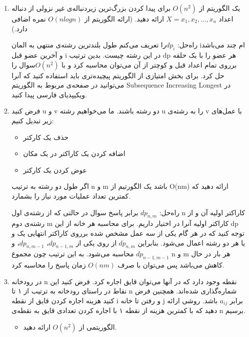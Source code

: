\documentclass{article}
\begin{document}
\begin{enumerate}
\item
یک الگوریتم از $O(n^2)$ برای پیدا کردن بزرگ‌ترین زیردنباله‌ی غیر نزولی از دنباله اعداد
$X = {x_1, x_2, ..., x_n}$
ارائه دهید.
(ارائه الگوریتم از $O(nlogn)$ نمره اضافی دارد.)

راه‌حل: $dp_i$را تعریف می‌کنم طول بلند‌ترین رشته‌ی منتهی به المان iام چند می‌باشد و آخرین عضو قبل i در این رشته چیست.
بدین ترتیب dp هر عضو را با یک حلقه برروی تمام اعداد قبل و کوچتر از آن می‌توان محاسبه کرد و با $O(n^2)$سوال را حل کرد. برای بخش امتیازی از الگوریتم پیچیده‌تری باید استفاده کنید که آنرا می‌توانید در صفحه‌ی مربوط به الگوریتم Subsequence Increasing Longest در ویکیپدیای فارسی پیدا کنید.
\item
فرض کنید u و v دو رشته باشند. ما می‌خواهیم رشته u را به رشته‌ی v با عمل‌های زیر تبدیل کنیم:
\begin{itemize}
    \item حذف یک کارکتر
    \item اضافه کردن یک کاراکتر در یک مکان
    \item
    عوض کردن یک کارکتر
\end{itemize}
اگر طول دو رشته به ترتیب n و m باشد یک الگورتیم از O(nm) ارائه دهید که کمترین تعداد عملیات مورد نیاز را بشمارد.

راه‌حل: $dp_{n,m}$ برابر پاسخ سوال در حالتی که از رشته‌ی اول n کاراکتر اولیه آن و از رشته‌ی دوم m کاراکتر اولیه آنرا در اختیار داریم. برای محاسبه هر خانه از این dp توجه کنید که در هر گام یکی از سه عمل مشخص شده برروی کاراکتر انتهایی یک و یا هر دو رشته اعمال می‌شود. بنابراین $dp_{n,m}$ از روی یکی از $dp_{n-1,m}$، $dp_{n,m-1}$، و$dp_{n-1, m-1}$ محاسبه می‌شود. به این ترتیب چون مجموع n و m هر بار در حال کاهش می‌باشد پس می‌توان با صرف $O(nm)$ زمان پاسخ را محاسبه کرد.
\item
در رودخانه n نقطه وجود دارد که در آنها می‌توان قایق اجاره کرد. فرض کنید این نقاط در راستای رود‌خانه به ترتیب از ۱ تا n شماره‌گذاری شده‌اند. همچنین فرض کنید هزینه اجاره کردن قایق از نقطه i و رفتن تا خانه j برابر $a_{ij}$
باشد. روشی ارائه دهید که با کمترین هزینه از نقطه ۱ با اجاره کردن تعدادی قایق به نقطه‌ی n برسیم.
\begin{itemize}
    \item الگوریتمی از $O(n^2)$ ارائه دهید.
\end{itemize}


\end{enumerate}
\end{document}
